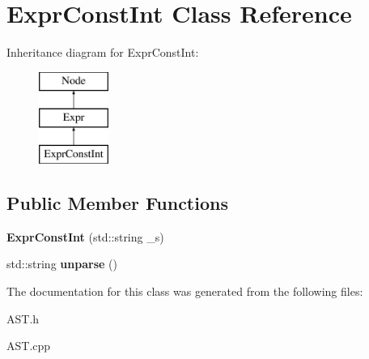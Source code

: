 \hypertarget{classExprConstInt}{\section{Expr\-Const\-Int Class Reference}
\label{classExprConstInt}
}
Inheritance diagram for Expr\-Const\-Int\-:\begin{figure}[H]
\begin{center}
\leavevmode
\includegraphics[height=3.000000cm]{classExprConstInt}
\end{center}
\end{figure}
\subsection*{Public Member Functions}
\begin{DoxyCompactItemize}
\item 
\hypertarget{classExprConstInt_aa98ec602e1a565c55926515c77d2d454}{{\bfseries Expr\-Const\-Int} (std\-::string \-\_\-s)}\label{classExprConstInt_aa98ec602e1a565c55926515c77d2d454}

\item 
\hypertarget{classExprConstInt_aa52a073b908704f4924d7fef4ca97a4b}{std\-::string {\bfseries unparse} ()}\label{classExprConstInt_aa52a073b908704f4924d7fef4ca97a4b}

\end{DoxyCompactItemize}


The documentation for this class was generated from the following files\-:\begin{DoxyCompactItemize}
\item 
A\-S\-T.\-h\item 
A\-S\-T.\-cpp\end{DoxyCompactItemize}
